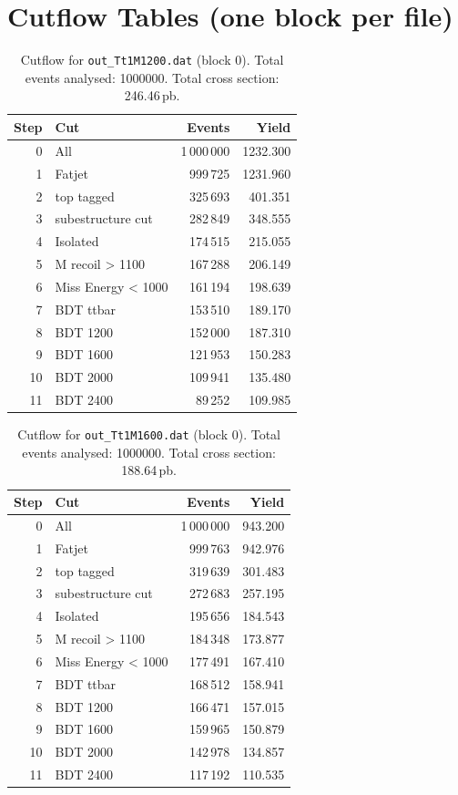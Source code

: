 \documentclass{article}
\begin{document}
\section*{Cutflow Tables (one block per file)}
\begin{table}[H]
\centering
\begin{tabular}{r l r r}
\toprule
Step & Cut & Events & Yield \\
\midrule
0 & All & 1\,000\,000 & 1232.300 \\
1 & Fatjet & 999\,725 & 1231.960 \\
2 & top tagged & 325\,693 & 401.351 \\
3 & subestructure cut & 282\,849 & 348.555 \\
4 & Isolated & 174\,515 & 215.055 \\
5 & M recoil > 1100 & 167\,288 & 206.149 \\
6 & Miss Energy < 1000 & 161\,194 & 198.639 \\
7 & BDT ttbar & 153\,510 & 189.170 \\
8 & BDT 1200 & 152\,000 & 187.310 \\
9 & BDT 1600 & 121\,953 & 150.283 \\
10 & BDT 2000 & 109\,941 & 135.480 \\
11 & BDT 2400 & 89\,252 & 109.985 \\
\bottomrule
\end{tabular}
\caption{Cutflow for \texttt{out\_Tt1M1200.dat} (block 0). Total events analysed: 1000000. Total cross section: 246.46\,pb.}
\label{tab:cutflow-out-Tt1M1200-dat}
\end{table}

\begin{table}[H]
\centering
\begin{tabular}{r l r r}
\toprule
Step & Cut & Events & Yield \\
\midrule
0 & All & 1\,000\,000 & 943.200 \\
1 & Fatjet & 999\,763 & 942.976 \\
2 & top tagged & 319\,639 & 301.483 \\
3 & subestructure cut & 272\,683 & 257.195 \\
4 & Isolated & 195\,656 & 184.543 \\
5 & M recoil > 1100 & 184\,348 & 173.877 \\
6 & Miss Energy < 1000 & 177\,491 & 167.410 \\
7 & BDT ttbar & 168\,512 & 158.941 \\
8 & BDT 1200 & 166\,471 & 157.015 \\
9 & BDT 1600 & 159\,965 & 150.879 \\
10 & BDT 2000 & 142\,978 & 134.857 \\
11 & BDT 2400 & 117\,192 & 110.535 \\
\bottomrule
\end{tabular}
\caption{Cutflow for \texttt{out\_Tt1M1600.dat} (block 0). Total events analysed: 1000000. Total cross section: 188.64\,pb.}
\label{tab:cutflow-out-Tt1M1600-dat}
\end{table}
\end{document}
